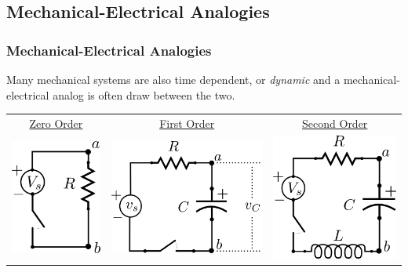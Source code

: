 \documentclass[fleqn]{beamer} %
\newcommand{\sectionIIsubsectionIItitle}{Mechanical-Electrical Analogies}
\begin{document}
		\subsection{\sectionIIsubsectionIItitle}\label{sectionIIsubsectionII}

			\begin{frame}
				\frametitle{\sectionIIsubsectionIItitle}


				Many mechanical systems are also time dependent, or {\it dynamic} and a mechanical-electrical analog is often draw between the two.

\renewcommand{\arraystretch}{1.5}
\begin{tabular}{ccc}
\underline{Zero Order}&\underline{First Order}&\underline{Second Order}\\
\includegraphics[scale=0.25]{images/r_circuit.png}&\includegraphics[scale=0.25]{images/rc_circuit.png}&\includegraphics[scale=0.25]{images/rlc_circuit.png}\\

\end{tabular}
\end{frame}
\end{document}
